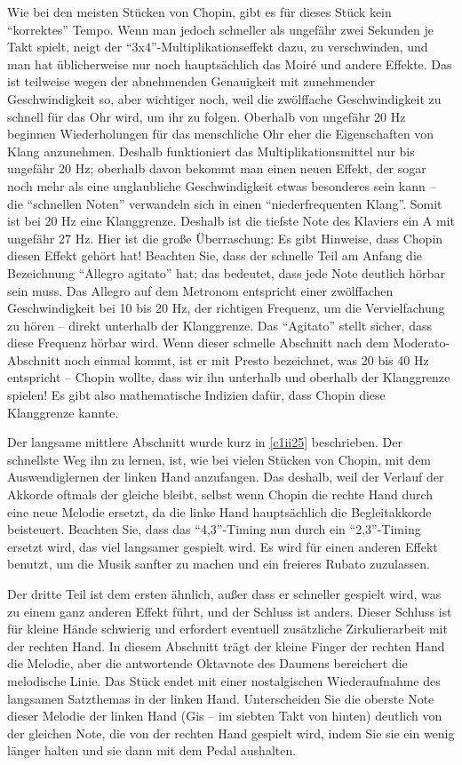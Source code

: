 Wie bei den meisten Stücken von Chopin, gibt es für dieses Stück kein \enquote{korrektes} Tempo.
Wenn man jedoch schneller als ungefähr zwei Sekunden je Takt spielt, neigt der \enquote{3x4}-Multiplikationseffekt dazu, zu verschwinden, und man hat üblicherweise nur noch hauptsächlich das Moiré und andere Effekte.
Das ist teilweise wegen der abnehmenden Genauigkeit mit zunehmender Geschwindigkeit so, aber wichtiger noch, weil die zwölffache Geschwindigkeit zu schnell für das Ohr wird, um ihr zu folgen.
Oberhalb von ungefähr 20 Hz beginnen Wiederholungen für das menschliche Ohr eher die Eigenschaften von Klang anzunehmen.
Deshalb funktioniert das Multiplikationsmittel nur bis ungefähr 20 Hz; oberhalb davon bekommt man einen neuen Effekt, der sogar noch mehr als eine unglaubliche Geschwindigkeit etwas besonderes sein kann -- die \enquote{schnellen Noten} verwandeln sich in einen \enquote{niederfrequenten Klang}.
Somit ist bei 20 Hz eine Klanggrenze.
Deshalb ist die tiefste Note des Klaviers ein A mit ungefähr 27 Hz.
Hier ist die große Überraschung: Es gibt Hinweise, dass Chopin diesen Effekt gehört hat!
Beachten Sie, dass der schnelle Teil am Anfang die Bezeichnung \enquote{Allegro agitato} hat; das bedeutet, dass jede Note deutlich hörbar sein muss.
Das Allegro auf dem Metronom entspricht einer zwölffachen Geschwindigkeit bei 10 bis 20 Hz, der richtigen Frequenz, um die Vervielfachung zu hören -- direkt unterhalb der Klanggrenze.
Das \enquote{Agitato} stellt sicher, dass diese Frequenz hörbar wird.
Wenn dieser schnelle Abschnitt nach dem Moderato-Abschnitt noch einmal kommt, ist er mit Presto bezeichnet, was 20 bis 40 Hz entspricht -- Chopin wollte, dass wir ihn unterhalb und oberhalb der Klanggrenze spielen!
Es gibt also mathematische Indizien dafür, dass Chopin diese Klanggrenze kannte.

Der langsame mittlere Abschnitt wurde kurz in \hyperref[c1ii25]{\autoref{c1ii25}} beschrieben.
Der schnellste Weg ihn zu lernen, ist, wie bei vielen Stücken von Chopin, mit dem Auswendiglernen der linken Hand anzufangen.
Das deshalb, weil der Verlauf der Akkorde oftmals der gleiche bleibt, selbst wenn Chopin die rechte Hand durch eine neue Melodie ersetzt, da die linke Hand hauptsächlich die Begleitakkorde beisteuert.
Beachten Sie, dass das \enquote{4,3}-Timing nun durch ein \enquote{2,3}-Timing ersetzt wird, das viel langsamer gespielt wird.
Es wird für einen anderen Effekt benutzt, um die Musik sanfter zu machen und ein freieres Rubato zuzulassen.

Der dritte Teil ist dem ersten ähnlich, außer dass er schneller gespielt wird, was zu einem ganz anderen Effekt führt, und der Schluss ist anders.
Dieser Schluss ist für kleine Hände schwierig und erfordert eventuell zusätzliche Zirkulierarbeit mit der rechten Hand.
In diesem Abschnitt trägt der kleine Finger der rechten Hand die Melodie, aber die antwortende Oktavnote des Daumens bereichert die melodische Linie.
Das Stück endet mit einer nostalgischen Wiederaufnahme des langsamen Satzthemas in der linken Hand.
Unterscheiden Sie die oberste Note dieser Melodie der linken Hand (Gis -- im siebten Takt von hinten) deutlich von der gleichen Note, die von der rechten Hand gespielt wird, indem Sie sie ein wenig länger halten und sie dann mit dem Pedal aushalten.

